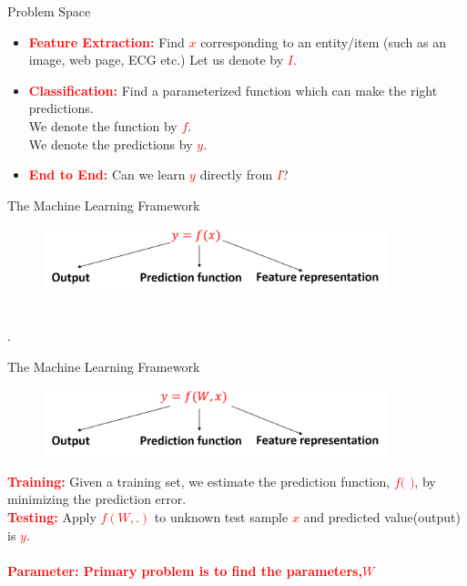 \documentclass[aspectratio=169,14pt]{beamer}
\begin{document}
\begin{frame}{{Problem Space}}
\begin{itemize}
    \item<2-> {\textbf{\textcolor{red}{Feature Extraction:}}} Find {\textcolor{red}{$x$}} corresponding to an  entity/item (such as an image, web page, ECG  etc.) Let us denote by {\textcolor{red}{$I$}}.
   \item<3-> {\textbf{\textcolor{red}{Classification:}}} Find a parameterized function which can make the right predictions.\\
   We denote the function by {\textcolor{red}{$f$}}. \\
   We denote the predictions by {\textcolor{red}{$y$}}.
   \item<4-> {\textbf{\textcolor{red}{End to End:}}} Can we learn {\textcolor{red}{$y$}} directly from {\textcolor{red}{$I$}}?
\end{itemize}
\end{frame}


\begin{frame}[t]{The Machine Learning Framework}
\vspace{-0.5cm}
\begin{figure} 
\includegraphics[width=10cm]{Images/AAv_Picture15.png} 
\end{figure}
	\\
.
\end{frame}

\begin{frame}[t]{The Machine Learning Framework}
\vspace{-0.5cm}
\begin{figure} 
\includegraphics[width=10cm]{Images/AAv_Picture16.png} 
\end{figure}

{\textbf{\textcolor{red}{Training:}}} Given a training set, we estimate the prediction function, {\textcolor{red}{$f($ $)$}}, by minimizing the prediction error.
	\\
{\textbf{\textcolor{red}{Testing:}}} Apply {\textcolor{red}{$f(W,.)$}} to unknown test sample {\textcolor{red}{$x$}} and predicted value(output) is {\textcolor{red}{$y$}}.
\\~\\
{\textbf{\footnotesize{{\textcolor{red}{Parameter: Primary problem is to find the parameters,}}}{\textcolor{red}{$W$}}}}
\end{frame}
\end{document}
